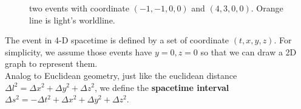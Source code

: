 \documentclass[12pt]{article}
\theoremstyle{mystyle}{\newtheorem{definition}{Definition}[section]}
\theoremstyle{mystyle}{\newtheorem{theorem}[definition]{Theorem}}
\theoremstyle{mystyle}{\newtheorem*{remark}{Remark}}
\theoremstyle{mystyle}{\newtheorem*{example}{Example}}
\theoremstyle{mystyle}{\newtheorem*{examples}{Examples}}
\theoremstyle{cstyle}{\newtheorem*{cthm}{}}
\begin{document}
\begin{figure}[ht]
  \begin{center}
    \caption[]{two events with coordinate $(-1, -1, 0, 0)$ and $(4, 3, 0, 0)$. Orange line is light's worldline.}
  \end{center}
\end{figure}

The event in 4-D spacetime is defined by a set of coordinate \((t, x, y, z)\).
For simplicity, we assume those events have $y=0, z=0$ so that we can draw a 2D graph to represent them.\\
Analog to Euclidean geometry, just like the euclidean distance \(\Delta l^2 = \Delta x^2 + \Delta y^2 + \Delta z^2\), we define the
\textbf{spacetime interval} $\Delta s^2 = - \Delta t^2 + \Delta x^2 + \Delta y^2 + \Delta z^2$.
\end{document}
